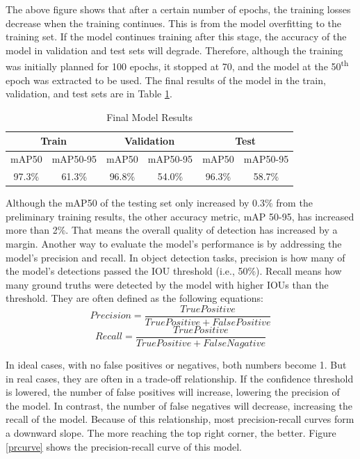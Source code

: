 The above figure shows that after a certain number of epochs, the training losses decrease when the training continues. This is from the model overfitting to the training set. If the model continues training after this stage, the accuracy of the model in validation and test sets will degrade. Therefore, although the training was initially planned for 100 epochs, it stopped at 70, and the model at the 50\textsuperscript{th} epoch was extracted to be used. The final results of the model in the train, validation, and test sets are in Table \ref{finaltable}.

\begin{table}[h]
\centering
\begin{tabular}{|cc|cc|cc|}
\hline
\multicolumn{2}{|c|}{\textbf{Train}} & \multicolumn{2}{c|}{\textbf{Validation}} & \multicolumn{2}{c|}{\textbf{Test}} \\ \hline
\multicolumn{1}{|c|}{mAP50} & mAP50-95 & \multicolumn{1}{c|}{mAP50} & mAP50-95 & \multicolumn{1}{c|}{mAP50} & mAP50-95 \\ \hline
\multicolumn{1}{|c|}{97.3\%} & 61.3\% & \multicolumn{1}{c|}{96.8\%} & 54.0\% & \multicolumn{1}{c|}{96.3\%} & 58.7\% \\ \hline
\end{tabular}%
\caption{Final Model Results}
\label{finaltable}
\end{table}

Although the mAP50 of the testing set only increased by 0.3\% from the preliminary training results, the other accuracy metric, mAP 50-95, has increased more than 2\%. That means the overall quality of detection has increased by a margin. 
\newpage
Another way to evaluate the model's performance is by addressing the model's precision and recall. In object detection tasks, precision is how many of the model's detections passed the IOU threshold (i.e., 50\%). Recall means how many ground truths were detected by the model with higher IOUs than the threshold. They are often defined as the following equations:
\begin{equation}
    Precision = \frac{True Positive}{True Positive + False Positive}
    \label{precision}
\end{equation}
\begin{equation}
    Recall = \frac{True Positive}{True Positive + False Nagative}
\end{equation}

In ideal cases, with no false positives or negatives, both numbers become 1. But in real cases, they are often in a trade-off relationship. If the confidence threshold is lowered, the number of false positives will increase, lowering the precision of the model. In contrast, the number of false negatives will decrease, increasing the recall of the model. Because of this relationship, most precision-recall curves form a downward slope. The more reaching the top right corner, the better. Figure \ref{prcurve} shows the precision-recall curve of this model.

